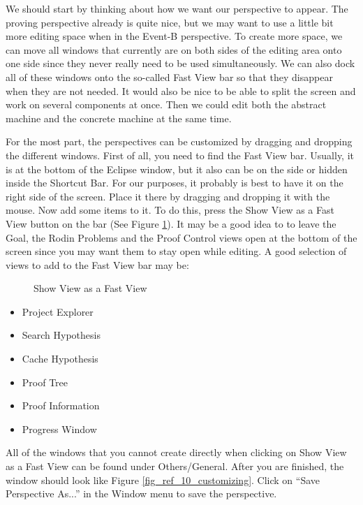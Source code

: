 We should start by thinking about how we want our perspective to appear. The proving perspective already is quite nice, but we may want to use a little bit more editing space when in the Event-B perspective. To create more space, we can move all windows that currently are on both sides of the editing area onto one side since they never really need to be used simultaneously. We can also dock all of these windows onto the so-called Fast View bar so that they disappear when they are not needed. It would also be nice to be able to split the screen and work on several components at once. Then we could edit both the abstract machine and the concrete machine at the same time.

For the most part, the perspectives can be customized by dragging and dropping the different windows. First of all, you need to find the Fast View bar. Usually, it is at the bottom of the Eclipse window, but it also can be on the side or hidden inside the Shortcut Bar. For our purposes, it probably is best to have it on the right side of the screen. Place it there by dragging and dropping it with the mouse. Now add some items to it. To do this, press the \textsf{Show View as a Fast View} button on the bar (See Figure \ref{fig_ref_01_customizing2}). It may be a good idea to to leave the Goal, the Rodin Problems and the Proof Control views open at the bottom of the screen since you may want them to stay open while editing. A good selection of views to add to the Fast View bar may be:

\begin{figure}[!ht]
\begin{center}
	\caption{Show View as a Fast View}
	\label{fig_ref_01_customizing2}
\end{center}
\end{figure}

\begin{itemize}
	\item Project Explorer	
	\item Search Hypothesis
	\item Cache Hypothesis
	\item Proof Tree
	\item Proof Information
	\item Progress Window
\end{itemize}

All of the windows that you cannot create directly when clicking on \textsf{Show View as a Fast View} can be found under \textsf{Others/General}. After you are finished, the window should look like Figure \ref{fig_ref_10_customizing}. Click on ``Save Perspective As...'' in the Window menu to save the perspective.

